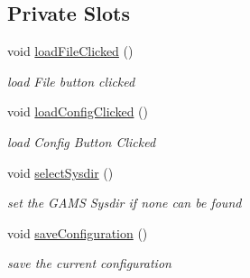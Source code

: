 \subsection*{Private Slots}
\begin{DoxyCompactItemize}
\item 
\hypertarget{class_wizard_a3e8121fb7eecf94c1c42b9059e0889cd}{}void \hyperlink{class_wizard_a3e8121fb7eecf94c1c42b9059e0889cd}{load\+File\+Clicked} ()\label{class_wizard_a3e8121fb7eecf94c1c42b9059e0889cd}

\begin{DoxyCompactList}\small\item\em load File button clicked \end{DoxyCompactList}\item 
\hypertarget{class_wizard_a0f4d2e63f1dd32a5a824a5aeecc88f43}{}void \hyperlink{class_wizard_a0f4d2e63f1dd32a5a824a5aeecc88f43}{load\+Config\+Clicked} ()\label{class_wizard_a0f4d2e63f1dd32a5a824a5aeecc88f43}

\begin{DoxyCompactList}\small\item\em load Config Button Clicked \end{DoxyCompactList}\item 
\hypertarget{class_wizard_abd795959fb203bacb7f1059d5ee65faf}{}void \hyperlink{class_wizard_abd795959fb203bacb7f1059d5ee65faf}{select\+Sysdir} ()\label{class_wizard_abd795959fb203bacb7f1059d5ee65faf}

\begin{DoxyCompactList}\small\item\em set the G\+A\+M\+S Sysdir if none can be found \end{DoxyCompactList}\item 
\hypertarget{class_wizard_a62b2e1b496cb07ca1f14e4c079470b16}{}void \hyperlink{class_wizard_a62b2e1b496cb07ca1f14e4c079470b16}{save\+Configuration} ()\label{class_wizard_a62b2e1b496cb07ca1f14e4c079470b16}

\begin{DoxyCompactList}\small\item\em save the current configuration \end{DoxyCompactList}\end{DoxyCompactItemize}
